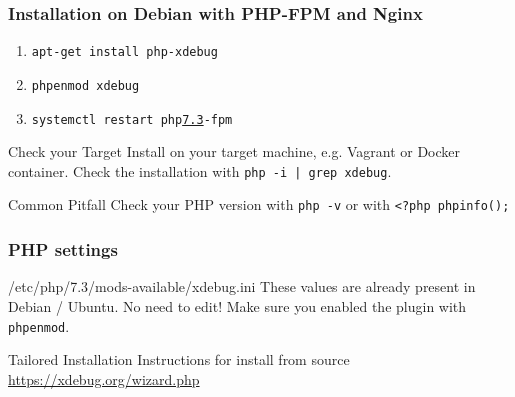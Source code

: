 \begin{frame}\frametitle{Installation on Debian with PHP-FPM and Nginx}
    \begin{enumerate}
        \item \texttt{apt-get install php-xdebug} \pause
        \item \texttt{phpenmod xdebug} \pause
        \item \texttt{systemctl restart php\underline{7.3}-fpm} \pause
    \end{enumerate}
    \begin{block}{Check your Target}
        Install on your target machine, e.g. Vagrant or Docker container. Check the installation with \texttt{php -i | grep xdebug}.
    \end{block}
    \pause
    \begin{alertblock}{Common Pitfall}
        Check your PHP version with \texttt{php -v} or with \texttt{<?php phpinfo();}
    \end{alertblock}
\end{frame}

\begin{frame}\frametitle{PHP settings}
    
    \begin{block}{/etc/php/7.3/mods-available/xdebug.ini}
        These values are already present in Debian / Ubuntu. No need to edit! Make sure you enabled the plugin with \texttt{phpenmod}.
    \end{block} \pause
    \begin{exampleblock}{Tailored Installation Instructions for install from source}
        \href{https://xdebug.org/wizard.php}{https://xdebug.org/wizard.php}
    \end{exampleblock}
\end{frame}
